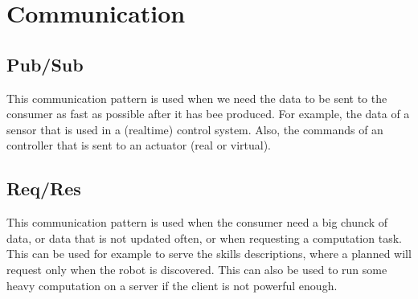 \documentclass[conference]{IEEEtran}
\begin{document}
\section{Communication}

\subsection{Pub/Sub}

This communication pattern is used when we need the data to be sent to the consumer as fast as possible after it has bee produced.
For example, the data of a sensor that is used in a (realtime) control system.
Also, the commands of an controller that is sent to an actuator (real or virtual).

\subsection{Req/Res}

This communication pattern is used when the consumer need a big chunck of data, or data that is not updated often, or when requesting a computation task.
This can be used for example to serve the skills descriptions, where a planned will request only when the robot is discovered.
This can also be used to run some heavy computation on a server if the client is not powerful enough.

\end{document}

